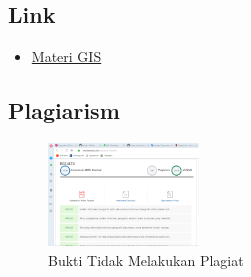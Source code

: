 \subsection{Link}
\begin{itemize}
	\item \href{https://youtu.be/CXKVVDaUo30}{Materi GIS}
\end{itemize}
\subsection{Plagiarism}
\begin{figure}[H]
	\includegraphics[width=4cm]{figures/1174003/1174003_plagiarisme.png}
	\centering
	\caption{Bukti Tidak Melakukan Plagiat}
\end{figure}